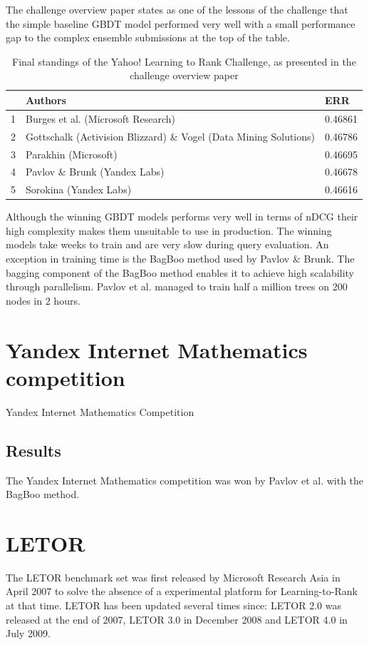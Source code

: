 The challenge overview paper \cite{Chapelle2011a} states as one of the lessons of the challenge that the simple baseline \ac{GBDT} model performed very well with a small performance gap to the complex ensemble submissions at the top of the table.\\

\begin{table}
\begin{tabular}{l|p{6.3cm}|l}
 & Authors & ERR \\
 \hline 
1 & Burges et al. (Microsoft Research) & 0.46861 \\ 
2 & Gottschalk (Activision Blizzard) \& Vogel (Data Mining Solutions) & 0.46786 \\ 
3 & Parakhin (Microsoft) & 0.46695 \\ 
4 & Pavlov \& Brunk (Yandex Labs) & 0.46678 \\ 
5 & Sorokina (Yandex Labs) & 0.46616 \\ 
\end{tabular}
\caption{Final standings of the Yahoo! Learning to Rank Challenge, as presented in the challenge overview paper \cite{Chapelle2011a}}
\label{fig:yahoo_results}
\end{table}

Although the winning \ac{GBDT} models performs very well in terms of \ac{nDCG} their high complexity makes them unsuitable to use in production. The winning models take weeks to train and are very slow during query evaluation. An exception in training time is the BagBoo \cite{Pavlov2010} method used by Pavlov \& Brunk. The bagging component of the BagBoo method enables it to achieve high scalability through parallelism. Pavlov et al. \cite{Pavlov2010} managed to train half a million trees on 200 nodes in 2 hours.
\section{Yandex Internet Mathematics competition}
Yandex Internet Mathematics Competition
\subsection{Results}
The Yandex Internet Mathematics competition was won by Pavlov et al. \cite{Pavlov2010} with the BagBoo method.


\section{LETOR}
The LETOR benchmark set was first released by Microsoft Research Asia in April 2007 \cite{Liu2007b} to solve the absence of a experimental platform for Learning-to-Rank at that time. LETOR has been updated several times since: LETOR 2.0 was released at the end of 2007, LETOR 3.0 in December 2008 and LETOR 4.0 in July 2009.\\


